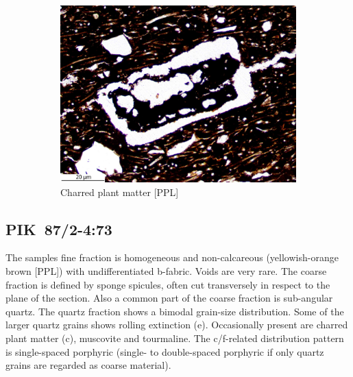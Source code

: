 \documentclass[a4paper]{article}
\begin{document}
\begin{figure}[H]
\begin{subfigure}[t]{.32\textwidth}
		\includegraphics[width=\textwidth]{ThinSections/99-4_10x_PPL.jpg}
		\caption{Charred plant matter [PPL]}
	\end{subfigure}
	\caption{}
	\label{fig:99_pik}
\end{figure}

\newpage\subsection{PIK~87/2-4:73 \citep[pik\#98; Fig.~\ref{fig:pik.pottery}.5; Pikunda-Munda style;][429 Pl.~48.25]{Seidensticker.2021e}}

\begin{multicols}{2}
\noindent The samples fine fraction is homogeneous and non-calcareous (yellowish-orange brown [PPL]) with undifferentiated b-fabric. Voids are very rare. The coarse fraction is defined by sponge spicules, often cut transversely in respect to the plane of the section. Also a common part of the coarse fraction is sub-angular quartz. The quartz fraction shows a bimodal grain-size distribution. Some of the larger quartz grains shows rolling extinction (e). Occasionally present are charred plant matter (c), muscovite and tourmaline. The c/f-related distribution pattern is single-spaced porphyric (single- to double-spaced porphyric if only quartz grains are regarded as coarse material).
\end{multicols}
\end{document}
